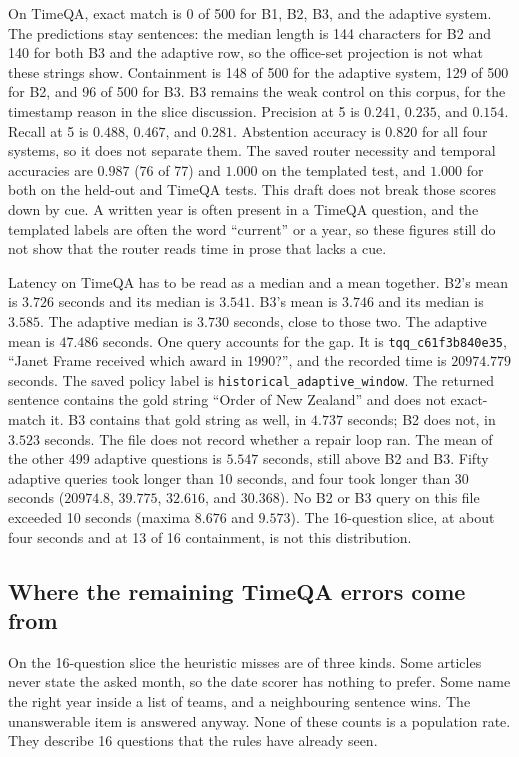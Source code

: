 \documentclass[11pt,letterpaper]{article}
\begin{document}
On TimeQA, exact match is 0 of 500 for B1, B2, B3, and the adaptive system.
The predictions stay sentences: the median length is 144 characters for B2 and 140 for both B3 and the adaptive row, so the office-set projection is not what these strings show.
Containment is 148 of 500 for the adaptive system, 129 of 500 for B2, and 96 of 500 for B3.
B3 remains the weak control on this corpus, for the timestamp reason in the slice discussion.
Precision at 5 is $0.241$, $0.235$, and $0.154$.
Recall at 5 is $0.488$, $0.467$, and $0.281$.
Abstention accuracy is $0.820$ for all four systems, so it does not separate them.
The saved router necessity and temporal accuracies are $0.987$ (76 of 77) and $1.000$ on the templated test, and $1.000$ for both on the held-out and TimeQA tests.
This draft does not break those scores down by cue.
A written year is often present in a TimeQA question, and the templated labels are often the word ``current'' or a year, so these figures still do not show that the router reads time in prose that lacks a cue.

Latency on TimeQA has to be read as a median and a mean together.
B2's mean is $3.726$ seconds and its median is $3.541$.
B3's mean is $3.746$ and its median is $3.585$.
The adaptive median is $3.730$ seconds, close to those two.
The adaptive mean is $47.486$ seconds.
One query accounts for the gap.
It is \texttt{tqq\_c61f3b840e35}, ``Janet Frame received which award in 1990?'', and the recorded time is $20974.779$ seconds.
The saved policy label is \texttt{historical\_adaptive\_window}.
The returned sentence contains the gold string ``Order of New Zealand'' and does not exact-match it.
B3 contains that gold string as well, in $4.737$ seconds; B2 does not, in $3.523$ seconds.
The file does not record whether a repair loop ran.
The mean of the other 499 adaptive questions is $5.547$ seconds, still above B2 and B3.
Fifty adaptive queries took longer than 10 seconds, and four took longer than 30 seconds ($20974.8$, $39.775$, $32.616$, and $30.368$).
No B2 or B3 query on this file exceeded 10 seconds (maxima $8.676$ and $9.573$).
The 16-question slice, at about four seconds and at 13 of 16 containment, is not this distribution.

\subsection{Where the remaining TimeQA errors come from}

On the 16-question slice the heuristic misses are of three kinds.
Some articles never state the asked month, so the date scorer has nothing to prefer.
Some name the right year inside a list of teams, and a neighbouring sentence wins.
The unanswerable item is answered anyway.
None of these counts is a population rate.
They describe 16 questions that the rules have already seen.
\end{document}
